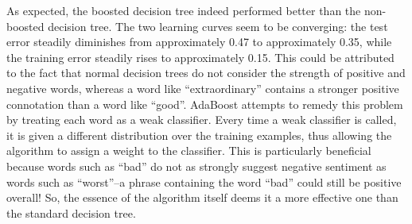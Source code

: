 \documentclass[11pt, a4paper]{article} %
\begin{document}
As expected, the boosted decision tree indeed performed better than the non-boosted decision tree. The two learning curves seem to be converging: the test error steadily diminishes from approximately 0.47 to approximately 0.35, while the training error steadily rises to approximately 0.15. This could be attributed to the fact that normal decision trees do not consider the strength of positive and negative words, whereas a word like ``extraordinary'' contains a stronger positive connotation than a word like ``good''. AdaBoost attempts to remedy this problem by treating each word as a weak classifier. Every time a weak classifier is called, it is given a different distribution over the training examples, thus allowing the algorithm to assign a weight to the classifier. This is particularly beneficial because words such as ``bad'' do not as strongly suggest negative sentiment as words such as ``worst''--a phrase containing the word ``bad'' could still be positive overall! So, the essence of the algorithm itself deems it a more effective one than the standard decision tree.
\end{document}
